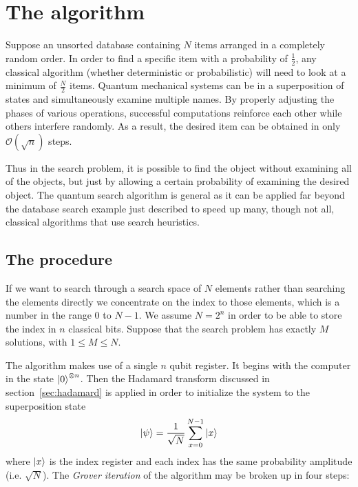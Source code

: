 \section{The algorithm}\label{sec:the-algorithm}
Suppose an unsorted database containing $N$ items arranged in a completely random order. In order to find a specific item with a probability of $\frac{1}{2}$, any classical algorithm (whether deterministic or probabilistic) will need to look at a minimum of $\frac{N}{2}$ items. Quantum mechanical systems can be in a superposition of states and simultaneously examine multiple names. By properly adjusting the phases of various operations, successful computations reinforce each other while others interfere randomly. As a result, the desired item can be obtained in only $\mathcal{O}(\sqrt{n})$ steps.

Thus in the search problem, it is possible to find the object without examining all of the objects, but just by allowing a certain probability of examining the desired object.
The quantum search algorithm is general as it can be applied far beyond the database search example just described to speed up many, though not all, classical algorithms that use search heuristics.

\subsection{The procedure}
If we want to search through a search space of $N$ elements rather than searching the elements directly we concentrate on the index to those elements, which is a number in the range $0$ to $N-1$. We assume $N=2^n$ in order to be able to store the index in $n$ classical bits. Suppose that the search problem has exactly $M$ solutions, with $1\leq M \leq N$.

The algorithm makes use of a single $n$ qubit register. It begins with the computer in the state $\ket{0}^{\otimes n}$. Then the Hadamard transform discussed in section~\ref{sec:hadamard} is applied in order to initialize the system to the superposition state
\begin{equation}\label{eq:initial-state}
   \ket{\psi} = \frac{1}{\sqrt{N}} \sum_{x=0}^{N-1}\ket{x}
\end{equation}
where $\ket{x}$ is the index register and each index has the same probability amplitude (i.e. $\sqrt{N}$).
The \emph{Grover iteration} of the algorithm may be broken up in four steps:


